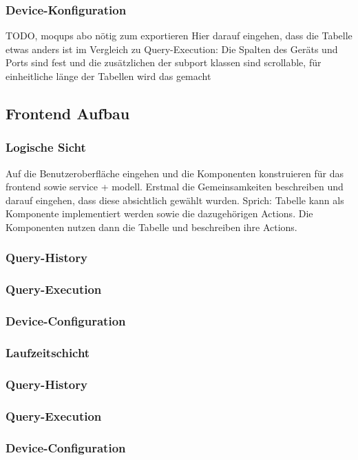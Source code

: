 \subsubsection{Device-Konfiguration}
TODO, moqups abo nötig zum exportieren
Hier darauf eingehen, dass die Tabelle etwas anders ist im Vergleich zu Query-Execution: Die Spalten des Geräts und Ports sind fest und die zusätzlichen der subport klassen sind scrollable, für einheitliche länge der Tabellen wird das gemacht

\subsection{Frontend Aufbau}

\subsubsection{Logische Sicht}
Auf die Benutzeroberfläche eingehen und die Komponenten konstruieren für das frontend sowie service + modell. 
Erstmal die Gemeinsamkeiten beschreiben und darauf eingehen, dass diese absichtlich gewählt wurden. Sprich:
Tabelle kann als Komponente implementiert werden sowie die dazugehörigen Actions. Die Komponenten nutzen dann die Tabelle und beschreiben ihre Actions.

\subsubsection{Query-History}
\subsubsection{Query-Execution}
\subsubsection{Device-Configuration}


\subsubsection{Laufzeitschicht}
\subsubsection{Query-History}
\subsubsection{Query-Execution}
\subsubsection{Device-Configuration}


